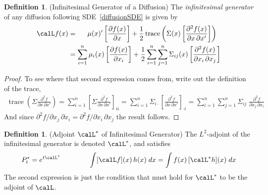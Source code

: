 \documentclass[12pt]{article}
\theoremstyle{plain}
\theoremstyle{definition}
\newtheorem{defn}[thm]{Definition}
\theoremstyle{remark}
\newcommand{\trace}{\operatorname{trace}}
\newcommand{\sumin}{\sum^n_{i=1}}
\newcommand{\sumjn}{\sum^n_{j=1}}
\begin{document}
\begin{defn}(Infinitesimal Generator of a Diffusion)
\label{defn:calL}
The \emph{infinitesimal generator} of any diffusion following
SDE~\ref{diffusionSDE} is given by
\begin{align*}
  \calL f(x)
  &=
  \;\,\quad
  \mu(x)'
  \left[
  \frac{\partial f(x)}{\partial x}
  \right]
  +
  \frac{1}{2}
  \trace\left(
    \Sigma(x)
    \left[
    \frac{\partial^2 f(x)}{\partial x\,\partial x'}
    \right]
  \right)
  \\
  &=
  \sumin
  \mu_{i}(x)
  \left[
  \frac{\partial f(x)}{\partial x_i}
  \right]
  +
  \frac{1}{2}
  \sumin
  \sumjn
  \Sigma_{ij}(x)
  \left[
  \frac{\partial^2 f(x)}{\partial x_i\,\partial x_j}
  \right]
\end{align*}
\end{defn}
\begin{proof}
To see where that second expression comes from, write out the definition
of the trace,
\begin{align*}
  \trace\left(
    \Sigma
    \frac{\partial^2 f}{\partial x\,\partial x'}
  \right)
  =
  \sum_{i=1}^n
  \left[
    \Sigma
    \frac{\partial^2 f}{\partial x\,\partial x'}
  \right]_{ii}
  =
  \sum_{i=1}^n
  \Sigma_{i\cdot}
  \left[
    \frac{\partial^2 f}{\partial x\,\partial x'}
  \right]_{\cdot i}
  =
  \sum_{i=1}^n
  \sum_{j=1}^n
  \Sigma_{ij}
  \;
  \frac{\partial^2 f}{\partial x_j\,\partial x_i}
\end{align*}
And since
$\partial^2 f/\partial x_j\,\partial x_i
=\partial^2 f/\partial x_i\,\partial x_j$
the result follows.
\end{proof}


\begin{defn}(Adjoint $\calL^*$ of Infinitesimal Generator)
\label{defn:Ladj}
The $L^2$-adjoint of the infinitesimal generator is denoted $\calL^*$,
and satisfies
\begin{align*}
  P_t^*
  =
  e^{t\calL^*}
  \qquad
  \qquad
  \int [\calL f](x)\,h(x)\;dx
  =
  \int f(x)\,[\calL^* h](x)\;dx
\end{align*}
The second expression is just the condition that must hold for $\calL^*$
to be the adjoint of $\calL$.
\end{defn}
\end{document}
